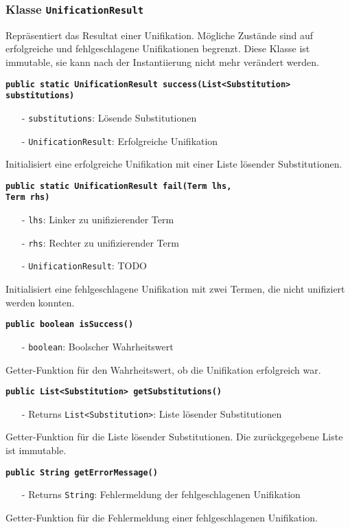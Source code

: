 \documentclass[parskip=full,11pt,twoside]{scrartcl}
\begin{document}
\subsubsection{Klasse \texttt{UnificationResult}}
Repräsentiert das Resultat einer Unifikation. Mögliche Zustände sind auf erfolgreiche und fehlgeschlagene Unifikationen begrenzt. Diese Klasse ist immutable, sie kann nach der Instantiierung nicht mehr verändert werden.

\textbf{\texttt{public static UnificationResult success(List<Substitution>\\substitutions)}}
\begin{itemize}[noitemsep]
	\item[-] \texttt{substitutions}: Lösende Substitutionen
	\item[-] \texttt{UnificationResult}: Erfolgreiche Unifikation
\end{itemize}
Initialisiert eine erfolgreiche Unifikation mit einer Liste lösender Substitutionen.

\textbf{\texttt{public static UnificationResult fail(Term lhs,\\Term rhs)}}
\begin{itemize}[noitemsep]
	\item[-] \texttt{lhs}: Linker zu unifizierender Term
	\item[-] \texttt{rhs}: Rechter zu unifizierender Term
	\item[-] \texttt{UnificationResult}: TODO
\end{itemize}
Initialisiert eine fehlgeschlagene Unifikation mit zwei Termen, die nicht unifiziert werden konnten.

\textbf{\texttt{public boolean isSuccess()}}
\begin{itemize}[noitemsep]
	\item[-] \texttt{boolean}: Boolscher Wahrheitswert
\end{itemize}
Getter-Funktion für den Wahrheitswert, ob die Unifikation erfolgreich war.

\textbf{\texttt{public List<Substitution> getSubstitutions()}}
\begin{itemize}[noitemsep]
	\item[-] Returns \texttt{List<Substitution>}: Liste lösender Substitutionen
\end{itemize}
Getter-Funktion für die Liste lösender Substitutionen. Die zurückgegebene Liste ist immutable.

\textbf{\texttt{public String getErrorMessage()}}
\begin{itemize}[noitemsep]
	\item[-] Returns \texttt{String}: Fehlermeldung der fehlgeschlagenen Unifikation
\end{itemize}
Getter-Funktion für die Fehlermeldung einer fehlgeschlagenen Unifikation.
\end{document}
